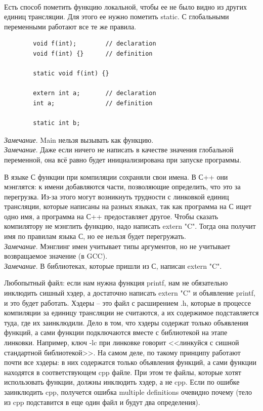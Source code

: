 \documentclass[12pt, a4paper]{article}
\begin{document}
	\\\par Есть способ пометить функцию локальной, чтобы ее не было видно из других единиц трансляции. Для этого ее нужно пометить static. С глобальными переменными работают все те же правила.
	\begin{verbatim}
		void f(int);        // declaration
		void f(int) {}      // definition
		
		static void f(int) {}
		
		extern int a;       // declaration
		int a;              // definition
		
		static int b;
	\end{verbatim}
	\textit{Замечание}. Main нельзя вызывать как функцию.\\
	\textit{Замечание}. Даже если ничего не написать в качестве значения глобальной переменной, она всё равно будет инициализирована при запуске программы.
	\\\par В языке С функции при компиляции сохраняли свои имена. В С++ они мэнглятся: к имени добавляются части, позволяющие определить, что это за перегрузка. Из-за этого могут возникнуть трудности с линковкой единиц трансляции, которые написаны на разных языках, так как программа на С ищет одно имя, а программа на С++ предоставляет другое. Чтобы сказать компилятору не мэнглить функцию, надо написать extern "C". Тогда она получит имя по правилам языка С, но ее нельзя будет перегружать.\\
	\textit{Замечание}. Мэнглинг имен учитывает типы аргументов, но не учитывает возвращаемое значение (в GCC).\\
	\textit{Замечание}. В библиотеках, которые пришли из С, написан extern "C".
	\\\par Любопытный файл: если нам нужна функция printf, нам не обязательно инклюдить сишный хэдер, а достаточно написать extern "C" и объявление printf, и это будет работать. Хэдеры -- это файл с расширением .h, которые в процессе компиляции за единицу трансляции не считаются, а их содержимое подставляется туда, где их заинклюдили. Дело в том, что хэдеры содержат только объявления функций, а сами функции подключаются вместе с библиотекой на этапе линковки. Например, ключ -lc при линковке говорит <<линкуйся с сишной стандартной библиотекой>>. На самом деле, по такому принципу работают почти все хэдеры: в них содержатся только объявления функций, а сами функции  находятся в соответствующем cpp файле. При этом те файлы, которые хотят использовать функции, должны инклюдить хэдер, а не cpp. Если по ошибке заинклюдить cpp, получется ошибка multiple definitions очевидно почему (тело из cpp подставится в еще один файл и будут два определения).
\end{document}
